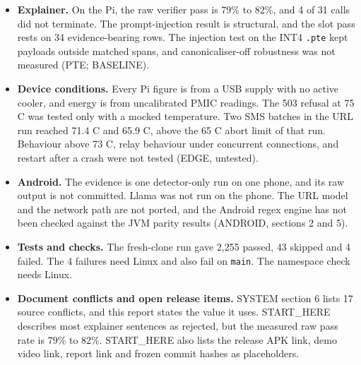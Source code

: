 \begin{itemize}
\item \textbf{Explainer.} On the Pi, the raw verifier pass is 79\% to 82\%\prose, and 4 of 31 calls did not terminate\prose. The prompt-injection result is structural, and the slot pass rests on 34 evidence-bearing rows. The injection test on the INT4 \texttt{.pte} kept payloads outside matched spans, and canonicaliser-off robustness was not measured (PTE; BASELINE).
\item \textbf{Device conditions.} Every Pi figure is from a USB supply with no active cooler, and energy is from uncalibrated PMIC readings. The 503 refusal at 75 \textdegree C was tested only with a mocked temperature. Two SMS batches in the URL run reached 71.4 \textdegree C and 65.9 \textdegree C\prose, above the 65 \textdegree C abort limit of that run. Behaviour above 73 \textdegree C, relay behaviour under concurrent connections, and restart after a crash were not tested (EDGE, untested).
\item \textbf{Android.} The evidence is one detector-only run on one phone, and its raw output is not committed. Llama was not run on the phone. The URL model and the network path are not ported, and the Android regex engine has not been checked against the JVM parity results (ANDROID, sections 2 and 5).
\item \textbf{Tests and checks.} The fresh-clone run gave 2,255 passed, 43 skipped and 4 failed. The 4 failures need Linux and also fail on \texttt{main}. The namespace check needs Linux.
\item \textbf{Document conflicts and open release items.} SYSTEM section 6 lists 17 source conflicts, and this report states the value it uses. START\_HERE describes most explainer sentences as rejected, but the measured raw pass rate is 79\% to 82\%. START\_HERE also lists the release APK link, demo video link, report link and frozen commit hashes as placeholders.
\end{itemize}

